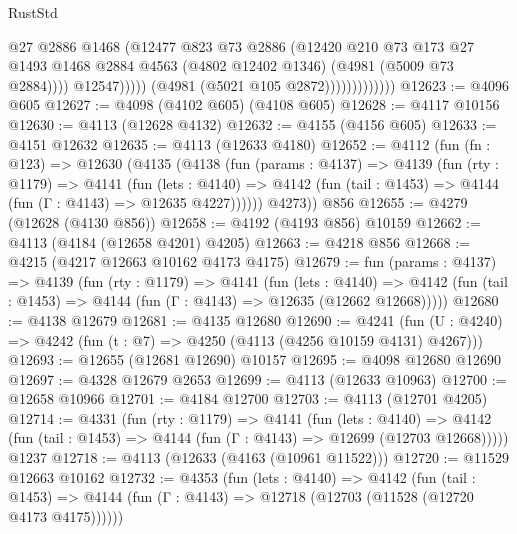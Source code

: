 \begin{lexlean}{RustStd}
\begin{coremodule}
                                    @27
                                    @2886
                                    @1468
                                    (@12477
                                      @823
                                      @73
                                      @2886
                                      (@12420
                                        @210
                                        @73
                                        @173
                                        @27
                                        @1493
                                        @1468
                                        @2884
                                        @4563
                                        (@4802 @12402 @1346)
                                        (@4981 (@5009 @73 @2884))))
                                    @12547)))))
                          (@4981 (@5021 @105 @2872)))))))))))))
@12623 := @4096 @605
@12627 := @4098 (@4102 @605) (@4108 @605)
@12628 := @4117 @10156
@12630 := @4113 (@12628 @4132)
@12632 := @4155 (@4156 @605)
@12633 := @4151 @12632
@12635 := @4113 (@12633 @4180)
@12652 := @4112
    (fun (fn : @123) =>
    @12630
      (@4135
        (@4138
          (fun (params : @4137) =>
          @4139
            (fun (rty : @1179) =>
            @4141
              (fun (lets : @4140) =>
              @4142 (fun (tail : @1453) => @4144 (fun (Γ : @4143) => @12635 @4227))))))
        @4273))
    @856
@12655 := @4279 (@12628 (@4130 @856))
@12658 := @4192 (@4193 @856) @10159
@12662 := @4113 (@4184 (@12658 @4201) @4205)
@12663 := @4218 @856
@12668 := @4215 (@4217 @12663 @10162 @4173 @4175)
@12679 := fun (params : @4137) =>
  @4139
    (fun (rty : @1179) =>
    @4141
      (fun (lets : @4140) =>
      @4142 (fun (tail : @1453) => @4144 (fun (Γ : @4143) => @12635 (@12662 @12668)))))
@12680 := @4138 @12679
@12681 := @4135 @12680
@12690 := @4241
    (fun (U : @4240) => @4242 (fun (t : @7) => @4250 (@4113 (@4256 @10159 @4131) @4267)))
@12693 := @12655 (@12681 @12690) @10157
@12695 := @4098 @12680 @12690
@12697 := @4328 @12679 @2653
@12699 := @4113 (@12633 @10963)
@12700 := @12658 @10966
@12701 := @4184 @12700
@12703 := @4113 (@12701 @4205)
@12714 := @4331
    (fun (rty : @1179) =>
    @4141
      (fun (lets : @4140) =>
      @4142 (fun (tail : @1453) => @4144 (fun (Γ : @4143) => @12699 (@12703 @12668)))))
    @1237
@12718 := @4113 (@12633 (@4163 (@10961 @11522)))
@12720 := @11529 @12663 @10162
@12732 := @4353
    (fun (lets : @4140) =>
    @4142
      (fun (tail : @1453) =>
      @4144 (fun (Γ : @4143) => @12718 (@12703 (@11528 (@12720 @4173 @4175))))))

\end{coremodule}
\end{lexlean}
